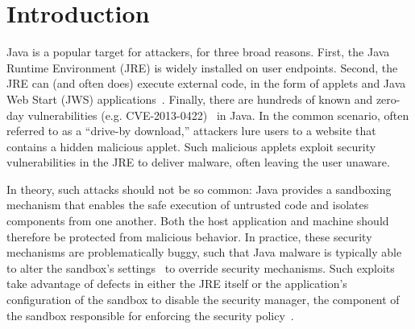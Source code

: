 \documentclass{sig-alternate}
\begin{document}
\section{Introduction}

Java is a popular target for attackers,
for three broad reasons. First, the Java Runtime Environment (JRE) is widely installed on user endpoints.
Second, the JRE can (and often does) execute external code, in the form of
applets and Java Web Start (JWS) %
applications~\cite{gong1997going,gong2003inside}. Finally, there are hundreds
of known and zero-day vulnerabilities (e.g. CVE-2013-0422)~\cite{xforceQ12013}
in Java. In the
common scenario, often referred to as a ``drive-by download,'' attackers lure
users to a website that contains a hidden malicious applet. Such malicious
applets exploit security vulnerabilities in the JRE to deliver malware,
often leaving the user unaware.


In theory, such attacks should not be so common:
Java provides a sandboxing mechanism that enables the safe execution of untrusted code and isolates
components from one another. Both the host application and machine should
therefore be protected from malicious behavior.
In practice, these security mechanisms are problematically
buggy, such that Java malware is typically able to alter the sandbox's
settings~\cite{garber_2012} to override security mechanisms. Such exploits take advantage of defects in either
the JRE itself or the application's configuration of the sandbox to
disable the security manager, the component of the sandbox responsible for enforcing the
security policy~\cite{fireeye_2013,svoboda_anatomy_blog_2013,security_explorations_2012,blackhat_2012}.
\end{document}
